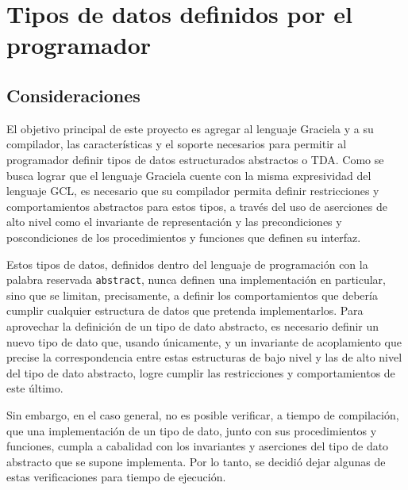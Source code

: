 \section{Tipos de datos definidos por el programador}



\subsection{Consideraciones}

El objetivo principal de este proyecto es agregar al lenguaje Graciela y a su
compilador, las características y el soporte necesarios para permitir al
programador definir tipos de datos estructurados abstractos o TDA. Como se busca
lograr que el lenguaje Graciela cuente con la misma expresividad del lenguaje
GCL, es necesario que su compilador permita definir restricciones y
comportamientos abstractos para estos tipos, a través del uso de aserciones de
alto nivel como el invariante de representación y las precondiciones y
poscondiciones de los procedimientos y funciones que definen su interfaz.

Estos tipos de datos, definidos dentro del lenguaje de programación con la
palabra reservada \texttt{abstract}, nunca definen una implementación en
particular, sino que se limitan, precisamente, a definir los comportamientos que
debería cumplir cualquier estructura de datos que pretenda implementarlos. Para
aprovechar la definición de un tipo de dato abstracto, es necesario definir un
nuevo tipo de dato que, usando únicamente, 
y un invariante de acoplamiento que precise la correspondencia entre estas
estructuras de bajo nivel y las de alto nivel del tipo de dato abstracto, logre
cumplir las restricciones y comportamientos de este último.

Sin embargo, en el caso general, no es posible verificar, a tiempo de
compilación, que una implementación de un tipo de dato, junto con sus
procedimientos y funciones, cumpla a cabalidad con los invariantes y aserciones
del tipo de dato abstracto que se supone implementa. Por lo tanto, se decidió
dejar algunas de estas verificaciones para tiempo de ejecución.

